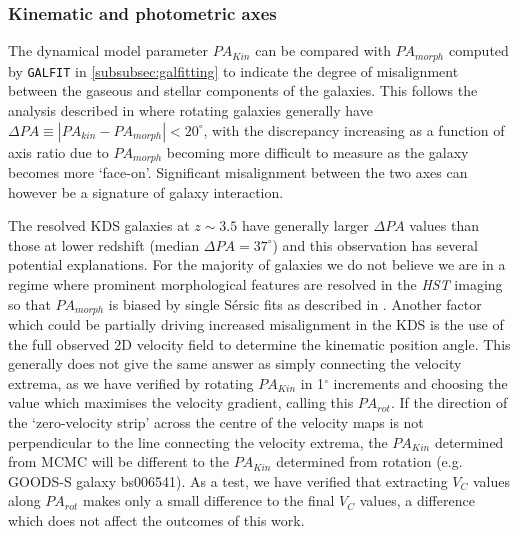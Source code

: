 \documentclass[fleqn,usenatbib]{mn2e}
\newcommand{\Sers}{S\'{e}rsic }
\begin{document}
\subsubsection{Kinematic and photometric axes}\label{subsubsection:kin_and_phot}

The dynamical model parameter $PA_{Kin}$ can be compared with $PA_{morph}$ computed by {\tt GALFIT} in \cref{subsubsec:galfitting} to indicate the degree of misalignment between the gaseous and stellar components of the galaxies.
This follows the analysis described in \citep[e.g.][]{Epinat2008,Epinat2012,Barrera-Ballesteros2014,Barrera-Ballesteros2015,Wisnioski2015,Harrison2017} where rotating galaxies generally have $\Delta PA \equiv |PA_{kin}-PA_{morph}| < 20^{\circ}$, with the discrepancy increasing as a function of axis ratio due to $PA_{morph}$ becoming more difficult to measure as the galaxy becomes more `face-on'.
Significant misalignment between the two axes can however be a signature of galaxy interaction.

The resolved KDS galaxies at $z \sim 3.5$ have generally larger $\Delta PA$ values than those at lower redshift (median $\Delta PA = 37^{\circ}$) and this observation has several potential explanations.
For the majority of galaxies we do not believe we are in a regime where prominent morphological features are resolved in the {\em HST} imaging so that $PA_{morph}$ is biased by single \Sers fits as described in \cite{Rodrigues2016}.
Another factor which could be partially driving increased misalignment in the KDS is the use of the full observed 2D velocity field to determine the kinematic position angle.
This generally does not give the same answer as simply connecting the velocity extrema, as we have verified by rotating $PA_{Kin}$ in 1$^{\circ}$ increments and choosing the value which maximises the velocity gradient, calling this $PA_{rot}$.
If the direction of the `zero-velocity strip' across the centre of the velocity maps is not perpendicular to the line connecting the velocity extrema, the $PA_{Kin}$ determined from MCMC will be different to the $PA_{Kin}$ determined from rotation (e.g. GOODS-S galaxy bs006541).
As a test, we have verified that extracting $V_{C}$ values along $PA_{rot}$ makes only a small difference to the final $V_{C}$ values, a difference which does not affect the outcomes of this work.
\end{document}
